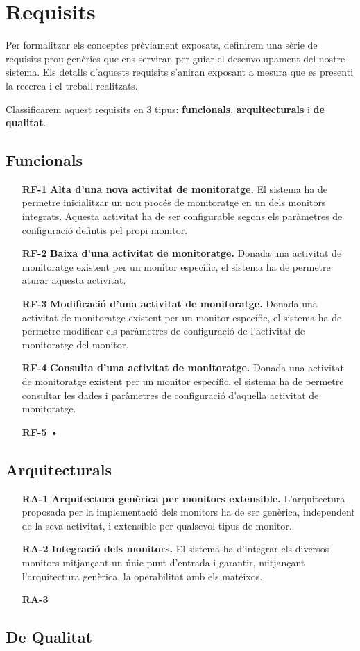 \section{Requisits}

Per formalitzar els conceptes prèviament exposats, definirem una sèrie de requisits prou genèrics que ens serviran per guiar el desenvolupament del nostre sistema. Els detalls d'aquests requisits s'aniran exposant a mesura que es presenti la recerca i el treball realitzats.

Classificarem aquest requisits en 3 tipus: \textbf{funcionals}, \textbf{arquitecturals} i \textbf{de qualitat}.

\subsection{Funcionals}

\begin{itemize}
\item[\textbf{RF-1}] \textbf{Alta d'una nova activitat de monitoratge.} El sistema ha de permetre inicialitzar un nou procés de monitoratge en un dels monitors integrats. Aquesta activitat ha de ser configurable segons els paràmetres de configuració defintis pel propi monitor.
\item[\textbf{RF-2}] \textbf{Baixa d'una activitat de monitoratge.} Donada una activitat de monitoratge existent per un monitor específic, el sistema ha de permetre aturar aquesta activitat.
\item[\textbf{RF-3}] \textbf{Modificació d'una activitat de monitoratge.} Donada una activitat de monitoratge existent per un monitor específic, el sistema ha de permetre modificar els paràmetres de configuració de l'activitat de monitoratge del monitor.
\item[\textbf{RF-4}] \textbf{Consulta d'una activitat de monitoratge.} Donada una activitat de monitoratge existent per un monitor específic, el sistema ha de permetre consultar les dades i paràmetres de configuració d'aquella activitat de monitoratge.
\item[\textbf{RF-5}] \textbf{•}
\end{itemize}

\subsection{Arquitecturals}

\begin{itemize}
\item[\textbf{RA-1}] \textbf{Arquitectura genèrica per monitors extensible.} L'arquitectura proposada per la implementació dels monitors ha de ser genèrica, independent de la seva activitat, i extensible per qualsevol tipus de monitor.
\item[\textbf{RA-2}] \textbf{Integració dels monitors.} El sistema ha d'integrar els diversos monitors mitjançant un únic punt d'entrada i garantir, mitjançant l'arquitectura genèrica, la operabilitat amb els mateixos.
\item[\textbf{RA-3}] \textbf{}
\end{itemize}

\subsection{De Qualitat}



